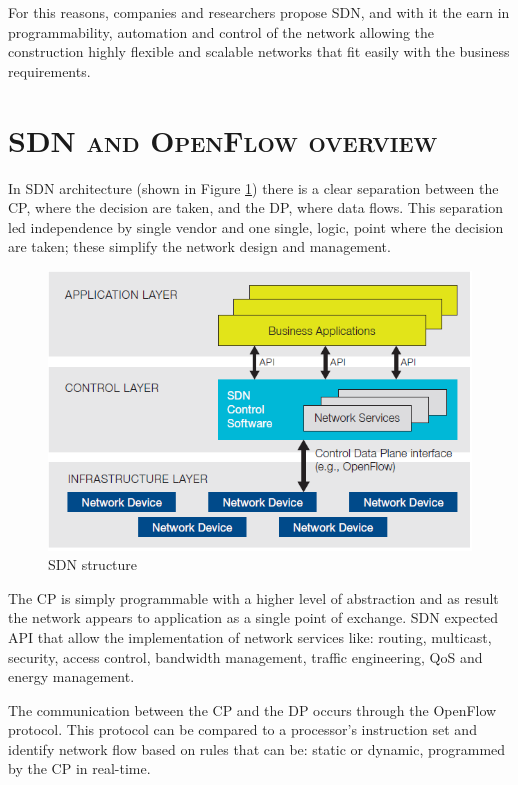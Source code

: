 For this reasons, companies and researchers propose \ac{SDN}, and with it the earn in programmability, automation and control of the network allowing the construction highly flexible and scalable networks that fit easily with the business requirements.

\section*{\small \textsc{\ac{SDN} and OpenFlow overview}}
In \ac{SDN} architecture (shown in Figure \ref{fig:sdn-and-openflow-overview:sdn-structure}) there is a clear separation between the \ac{CP}, where the decision are taken, and the \ac{DP}, where data flows. This separation led independence by single vendor and one single, logic, point where the decision are taken; these simplify the network design and management.

\begin{figure}
\centering
\includegraphics[scale=0.4]{Introduction/Image/SDNStructure.png}
\caption{\ac{SDN} structure}
\label{fig:sdn-and-openflow-overview:sdn-structure}
\end{figure}

The \ac{CP} is simply programmable with a higher level of abstraction and as result the network appears to application as a single point of exchange.
\ac{SDN} expected \ac{API} that allow the implementation of network services like: routing, multicast, security, access control, bandwidth management, traffic engineering, \ac{QoS} and energy management.

The communication between the \ac{CP} and the \ac{DP} occurs through the OpenFlow protocol. This protocol can be compared to a processor's instruction set and identify network flow based on rules that can be: static or dynamic, programmed by the \ac{CP} in real-time.

